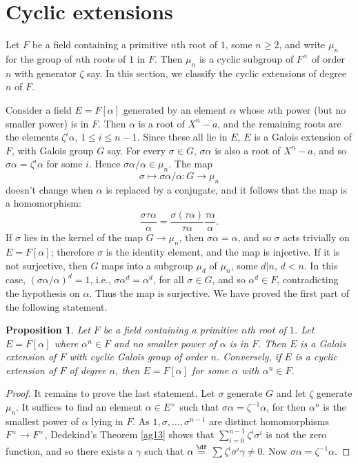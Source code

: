 \documentclass[a4paper,11pt,final,openany]{memoir}
\newtheorem{proposition}[X]{Proposition}
\theoremstyle{nonumberplain}
\newtheorem{proof}{Proof.}
\begin{document}
\section{Cyclic extensions}

Let $F$ be a field containing a primitive $n$th root of $1$, some $n\geq2$,
and write $\mu_{n}$ for the group of $n$th roots of $1$ in $F$. Then $\mu_{n}$
is a cyclic subgroup of $F^{\times}$ of order $n$ with generator $\zeta$ say.
In this section, we classify the cyclic extensions of degree $n$ of $F$.

Consider a field $E=F[\alpha]$ generated by an element $\alpha$ whose $n$th
power (but no smaller power) is in $F$. Then $\alpha$ is a root of $X^{n}-a$,
and the remaining roots are the elements $\zeta^{i}\alpha$, $1\leq i\leq n-1$.
Since these all lie in $E$, $E$ is a Galois extension of $F$, with Galois
group $G$ say. For every $\sigma\in G$, $\sigma\alpha$ is also a root of
$X^{n}-a$, and so $\sigma\alpha=\zeta^{i}\alpha$ for some $i$. Hence
$\sigma\alpha/\alpha\in\mu_{n}$. The map
\[
\sigma\mapsto\sigma\alpha/\alpha\colon G\rightarrow\mu_{n}%
\]
doesn't change when $\alpha$ is replaced by a conjugate, and it follows that
the map is a homomorphism:%
\[
\frac{\sigma\tau\alpha}{\alpha}=\frac{\sigma(\tau\alpha)}{\tau\alpha}%
\frac{\tau\alpha}{\alpha}.
\]
If $\sigma$ lies in the kernel of the map $G\rightarrow\mu_{n}$, then
$\sigma\alpha=\alpha$, and so $\sigma$ acts trivially on $E=F[\alpha]$;
therefore $\sigma$ is the identity element, and the map is injective. If it is
not surjective, then $G$ maps into a subgroup $\mu_{d}$ of $\mu_{n}$, some
$d|n$, $d<n$. In this case, $(\sigma\alpha/\alpha)^{d}=1$, i.e., $\sigma
\alpha^{d}=\alpha^{d}$, for all $\sigma\in G$, and so $\alpha^{d}\in F$,
contradicting the hypothesis on $\alpha$. Thus the map is surjective. We have
proved the first part of the following statement.

\begin{proposition}
\label{ag19b} Let $F$ be a field containing a primitive $n$th root of $1$. Let
$E=F[\alpha]$ where $\alpha^{n}\in F$ and no smaller power of $\alpha$ is in
$F$. Then $E$ is a Galois extension of $F$ with cyclic Galois group of order
$n$. Conversely, if $E$ is a cyclic extension of $F$ of degree $n$, then
$E=F[\alpha]$ for some $\alpha$ with $\alpha^{n}\in F$.
\end{proposition}

\begin{proof}
It remains to prove the last statement. Let $\sigma$ generate $G$ and let
$\zeta$ generate $\mu_{n}$. It suffices to find an element $\alpha\in
E^{\times}$ such that $\sigma\alpha=\zeta^{-1}\alpha$, for then $\alpha^{n}$
is the smallest power of $\alpha$ lying in $F$. As $1,\sigma,\ldots
,\sigma^{n-1}$ are distinct homomorphisms $F^{\times}\rightarrow F^{\times}$,
Dedekind's Theorem \ref{ag13} shows that $\sum_{i=0}^{n-1}\zeta^{i}\sigma^{i}$
is not the zero function, and so there exists a $\gamma$ such that
$\alpha\overset{\df}{=}$ $\sum\zeta^{i}\sigma^{i}\gamma\neq
0$. Now $\sigma\alpha=\zeta^{-1}\alpha$.
\end{proof}
\end{document}
